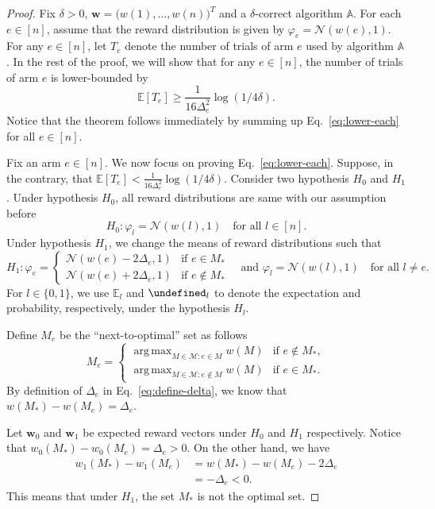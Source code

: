 \documentclass{article}
\newcommand{\Rew}{\varphi}
\newcommand{\E}{\mathbb E}
\newcommand{\M}{\mathcal M}
\DeclareMathOperator*{\argmax}{arg\,max}
\let\Pr\undefined
\DeclareMathOperator{\Pr}{Pr}
\renewcommand{\vec}[1]{\boldsymbol{#1}}
\begin{document}
\begin{proof}
Fix $\delta >0$, $\vec w =\big(w(1),\ldots,w(n)\big)^T$ and a $\delta$-correct algorithm $\mathbb A$.
For each $e\in [n]$, assume that the reward distribution is given by $\Rew_e=\mathcal N(w(e),1)$.
For any $e\in [n]$, let $T_e$ denote the  number of trials of arm $e$ used by algorithm $\mathbb A$.
In the rest of the proof, we will show that for any $e\in [n]$, the number of trials of arm $e$ is lower-bounded by
\begin{equation}
\E[T_e] \ge \frac{1}{16\Delta_e^2}\log(1/4\delta).
\label{eq:lower-each}
\end{equation}
Notice that the theorem follows immediately by summing up Eq.~\eqref{eq:lower-each} for all $e\in[n]$.


Fix an arm $e\in [n]$. We now focus on proving Eq.~\eqref{eq:lower-each}.
Suppose, in the contrary, that $\E[T_e] < \frac{1}{16\Delta_e^2}\log(1/4\delta)$.
Consider two hypothesis $H_0$ and $H_1$. 
Under hypothesis $H_0$, all reward distributions are same with our assumption before
$$
H_0: \Rew_l = \mathcal N(w(l),1) \quad \text{for all } l \in [n].
$$
Under hypothesis $H_1$, we change the means of reward distributions such that 
$$
H_1: 
	\Rew_e = \begin{cases}
	\mathcal N(w(e)-2\Delta_e,1) & \text{if } e\in M_*\\
	\mathcal N(w(e)+2\Delta_e,1) & \text{if } e\not\in M_*
\end{cases} 
\quad\text{and } \Rew_l=\mathcal N(w(l), 1) \quad\text{for all } l\not = e.
$$
For $l\in \{0,1\}$, we use $\E_l$ and $\Pr_l$ to denote the expectation and probability, respectively, under the hypothesis $H_l$.


Define $M_e$ be the ``next-to-optimal'' set as follows 
$$
M_e = \begin{cases}
		 \argmax_{M\in \M: e \in M} w(M) & \text{if } e\not \in M_*, \\
	     \argmax_{M\in \M: e \not\in M} w(M) & \text{if } e\in M_*.
	  \end{cases}
$$
By definition of $\Delta_e$ in Eq.~\eqref{eq:define-delta}, we know that $w(M_*)-w(M_e)=\Delta_e$.

Let $\vec w_0$ and $\vec w_1$ be expected reward vectors under $H_0$ and $H_1$ respectively.
Notice that $w_0(M_*)-w_0(M_e)=\Delta_e > 0$.
On the other hand, we have
\begin{align*}
w_1(M_*)-w_1(M_e) &= w(M_*)-w(M_e)-2\Delta_e \\
								  &= -\Delta_e < 0.
\end{align*}
This means that under $H_1$, the set $M_*$ is not the optimal set.


\end{proof}
\end{document}
